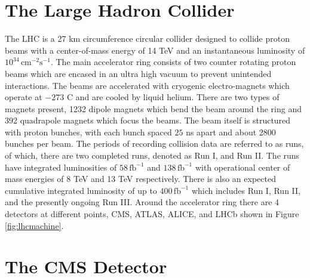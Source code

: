 \section{The Large Hadron Collider}
The LHC is a 27 km circumference circular collider designed to collide proton beams with a center-of-mass energy of 14 TeV and an instantaneous luminosity of $10^{34} \, \text{cm}^{-2}\text{s}^{-1}$\cite{Evans:2008zzb}. The main accelerator ring consists of two counter rotating proton beams which are encased in an ultra high vacuum to prevent unintended interactions. The beams are accelerated with cryogenic electro-magnets which operate at $-273$ \degree C and are cooled by liquid helium. There are two types of magnets present, 1232 dipole magnets which bend the beam around the ring and 392 quadrapole magnets which focus the beams.  The beam itself is structured with proton bunches, with each bunch spaced $25$ ns apart and about 2800 bunches per beam. The periods of recording collision data are referred to as runs, of which, there are two completed runs, denoted as Run I, and Run II. The runs have integrated luminosities of $58 \, \text{fb}^{-1}$ and $138\, \text{fb}^{-1}$ with operational center of mass energies of 8 TeV and 13 TeV respectively. There is also an expected cumulative integrated luminosity of up to $400 \,\text{fb}^{-1}$ which includes Run I, Run II, and the presently ongoing Run III. Around the accelerator ring there are 4 detectors at different points, CMS, ATLAS, ALICE, and LHCb shown in Figure \ref{fig:lhcmachine}.




\section{The CMS Detector}

